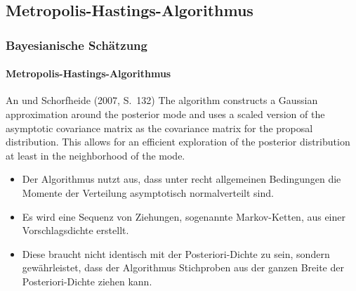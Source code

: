 \documentclass{beamer} %
\begin{document}
\subsection{Metropolis-Hastings-Algorithmus}
\begin{frame}\frametitle{Bayesianische Sch\"{a}tzung}\framesubtitle{Metropolis-Hastings-Algorithmus}
\begin{block}{An und Schorfheide (2007, S.~132)}
  The algorithm constructs a Gaussian approximation around the posterior mode and
  uses a scaled version of the asymptotic covariance matrix as the covariance
  matrix for the proposal distribution. This allows for an efficient
  exploration of the posterior distribution at least in the neighborhood of
  the mode.
\end{block}
\begin{itemize}
  \item Der Algorithmus nutzt aus, dass unter recht allgemeinen Bedingungen die Momente der Verteilung asymptotisch
normalverteilt sind.
\item Es wird eine Sequenz von Ziehungen, sogenannte Markov-Ketten, aus einer Vorschlagsdichte erstellt.
\item Diese braucht nicht identisch mit der Posteriori-Dichte zu sein, sondern gew\"{a}hrleistet, dass der Algorithmus
Stichproben aus der ganzen Breite der Posteriori-Dichte ziehen kann.
\end{itemize}
\end{frame}
\end{document}
